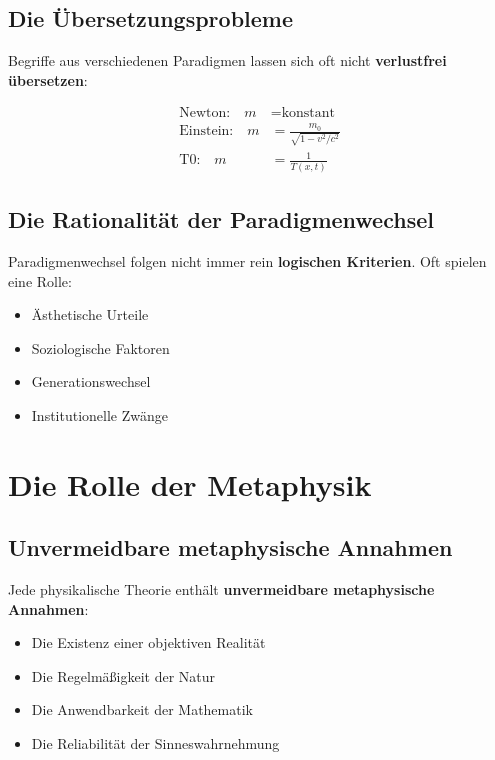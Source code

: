 \documentclass[12pt,a4paper]{report}
\begin{document}
	\subsection{Die Übersetzungsprobleme}
	
	Begriffe aus verschiedenen Paradigmen lassen sich oft nicht \textbf{verlustfrei übersetzen}:
	
	\begin{align}
		\text{Newton:} \quad m &= \text{konstant} \\
		\text{Einstein:} \quad m &= \frac{m_0}{\sqrt{1-v^2/c^2}} \\
		\text{T0:} \quad m &= \frac{1}{T(x,t)}
	\end{align}
	
	\subsection{Die Rationalität der Paradigmenwechsel}
	
	Paradigmenwechsel folgen nicht immer rein \textbf{logischen Kriterien}. Oft spielen eine Rolle:
	
	\begin{itemize}
		\item Ästhetische Urteile
		\item Soziologische Faktoren
		\item Generationswechsel
		\item Institutionelle Zwänge
	\end{itemize}
	
	\section{Die Rolle der Metaphysik}
	
	\subsection{Unvermeidbare metaphysische Annahmen}
	
	Jede physikalische Theorie enthält \textbf{unvermeidbare metaphysische Annahmen}:
	
	\begin{itemize}
		\item Die Existenz einer objektiven Realität
		\item Die Regelmäßigkeit der Natur
		\item Die Anwendbarkeit der Mathematik
		\item Die Reliabilität der Sinneswahrnehmung
	\end{itemize}
	
\end{document}
